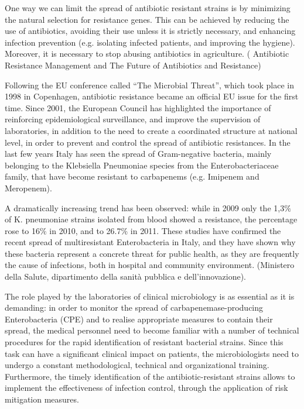 \documentclass[11pt]{report}
\begin{document}
One way we can limit the spread of antibiotic resistant strains is by minimizing the natural selection for resistance genes.
This can be achieved by reducing the use of antibiotics, avoiding their use unless it is strictly necessary, and enhancing infection prevention (e.g. isolating infected patients, and improving the hygiene). Moreover, it is necessary to stop abusing antibiotics in agriculture. ( Antibiotic Resistance Management and The Future of Antibiotics and Resistance)

Following the EU conference called “The Microbial Threat”, which took place in 1998 in Copenhagen, antibiotic resistance became an official EU issue for the first time. Since 2001, the European Council has highlighted the importance of reinforcing epidemiological surveillance, and improve the supervision of laboratories, in addition to the need to create a  coordinated structure at national level, in order to prevent and control the spread of antibiotic resistances.
In the last few years Italy has seen the spread of Gram-negative bacteria, mainly belonging to the Klebsiella Pneumoniae species from the Enterobacteriaceae family, that have become resistant to carbapenems (e.g. Imipenem and Meropenem).

A dramatically increasing trend has been observed: while in 2009 only the 1,3$\%$ of K. pneumoniae strains isolated from blood showed a resistance, the percentage rose to 16$\%$ in 2010, and to 26.7$\%$ in 2011.
These studies have confirmed the recent spread of multiresistant Enterobacteria in Italy, and they have shown why these bacteria represent a concrete threat for public health, as they are frequently the cause of infections, both in hospital and community environment.
(Ministero della Salute, dipartimento della sanità pubblica e dell’innovazione).

The role played by the laboratories of clinical microbiology is as essential as it is demanding: in order to monitor the spread of carbapenemase-producing Enterobacteria (CPE) and to realise appropriate measures to contain their spread, the medical personnel need to become familiar with a number of technical procedures for the rapid identification of resistant bacterial strains. Since this task can have a significant clinical impact on patients, the microbiologists need to undergo a constant methodological, technical and organizational training. Furthermore, the timely identification of the antibiotic-resistant strains allows to implement the effectiveness of infection control, through the application of risk mitigation measures.
\end{document}
